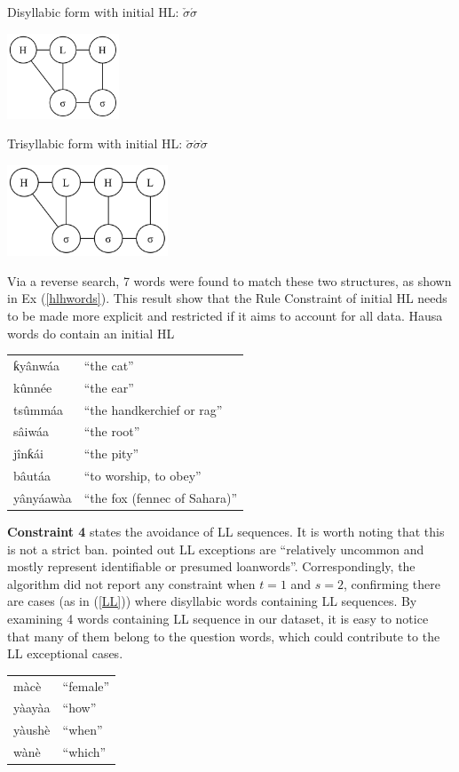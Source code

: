 \documentclass[11pt,letterpaper]{article}
\begin{document}
\begin{multicols}{2}
\ea Disyllabic form with initial HL: $\check{\sigma}\acute{\sigma}$

	\includegraphics[width=0.25\textwidth]{hausacons/missing}
	\label{missing1}
\z

\ea Trisyllabic form with initial HL: $\check{\sigma}\acute{\sigma}\grave{\sigma}$

	\includegraphics[width=0.36\textwidth]{hausacons/missing2}
	\label{missing2}
\z
\end{multicols}

Via a reverse search, 7 words were found to match these two structures, as shown in Ex (\ref{hlhwords}). This result show that the Rule Constraint of initial HL needs to be made more explicit and restricted if it aims to account for all data. 
\ea Hausa words do contain an initial HL

\label{hlhwords}
\begin{tabular}{ll}
	ƙyânwáa &	``the cat'' \\
	kûnnée 	& 	``the ear''\\
	tsûmmáa	& 	``the handkerchief or rag''\\
	sâiwáa	& 	``the root''\\
	jînƙái	& 	``the pity''\\
	bâutáa 	&	``to worship, to obey''\\
	yânyáawàa & ``the fox (fennec of Sahara)''
\end{tabular}
\z


\textbf{Constraint 4} states the avoidance of LL sequences. It is worth noting that this is not a strict ban. \citet[p.606]{Newmanbook} pointed out LL exceptions are ``relatively uncommon and mostly represent identifiable or presumed loanwords''. Correspondingly, the algorithm did not report any constraint when \(t=1\) and \(s =2\), confirming there are cases (as in (\ref{LL})) where disyllabic words containing LL sequences. By examining 4 words containing LL sequence in our dataset, it is easy to notice that many of them belong to the question words, which could contribute to the LL exceptional cases. 
\ea \label{LL}
\begin{tabular}{ll}
	màcè & ``female''\\
	yàayàa & ``how''\\
	yàushè & ``when'' \\
	wànè & ``which'' \\
\end{tabular}
\z
\end{document}
